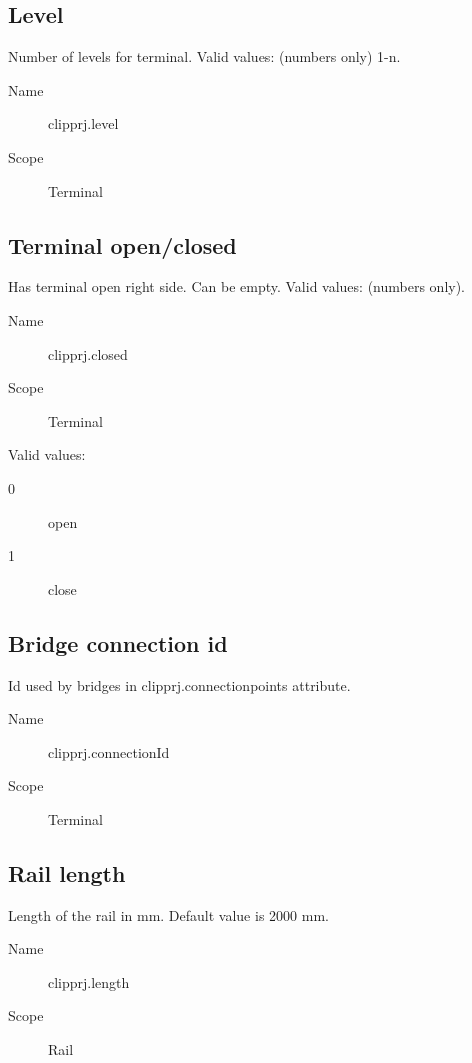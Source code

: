 \documentclass[%
	a4paper,
	oneside,
	listof=numbered,
	parskip=half,
	headsepline=true,
	footsepline=false,
	normalheadings,
	0.7headlines,
	headexclude,
	]{scrbook}
\begin{document}
\subsection{Level}

Number of levels for terminal.
Valid values: (numbers only) 1-n.

\begin{description}
	\item[Name] clipprj.level
	\item[Scope] Terminal
\end{description}

\subsection{Terminal open/closed}

Has terminal open right side.
Can be empty.
Valid values: (numbers only).

\begin{description}
	\item[Name] clipprj.closed
	\item[Scope] Terminal
\end{description}

Valid values:

\begin{description}
	\item[0] open
	\item[1] close
\end{description}

\subsection{Bridge connection id}

Id used by bridges in clipprj.connectionpoints attribute.

\begin{description}
	\item[Name] clipprj.connectionId
	\item[Scope] Terminal
\end{description}

\subsection{Rail length}

Length of the rail in mm.
Default value is 2000 mm.

\begin{description}
	\item[Name] clipprj.length
	\item[Scope] Rail
\end{description}
\end{document}
